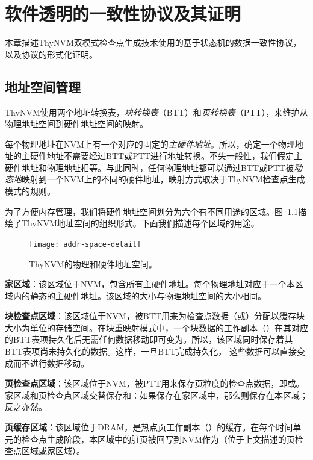 \chapter{软件透明的一致性协议及其证明}
\label{chap:protocol}

本章描述ThyNVM双模式检查点生成技术使用的基于状态机的数据一致性协议，以及协议的形式化证明。

\section{地址空间管理}

ThyNVM使用两个地址转换表，\emph{块转换表}（BTT）和\emph{页转换表}（PTT），来维护从物理地址空间到硬件地址空间的映射。

每个物理地址在NVM上有一个对应的固定的\emph{主硬件地址}。所以，确定一个物理地址的主硬件地址不需要经过BTT或PTT进行地址转换。不失一般性，我们假定主硬件地址和物理地址相等。与此同时，任何物理地址都可以通过BTT或PTT被\emph{动态地}映射到一个NVM上的不同的硬件地址，映射方式取决于ThyNVM检查点生成模式的规则。

为了方便内存管理，我们将硬件地址空间划分为六个有不同用途的区域。图~\ref{fig:addr-space-detail}描绘了ThyNVM地址空间的组织形式。下面我们描述每个区域的用途。

\begin{figure}[!h]
\centering
\texttt{[image: addr-space-detail]}
\caption{ThyNVM的物理和硬件地址空间。}
\label{fig:addr-space-detail}
\end{figure}


\textbf{家区域}：该区域位于NVM，包含所有主硬件地址。每个物理地址对应于一个本区域内的静态的主硬件地址。该区域的大小与物理地址空间的大小相同。

\textbf{块检查点区域}：该区域位于NVM，被BTT用来为检查点数据（\cl[block]或\cp[block]）分配以缓存块大小为单位的存储空间。在块重映射模式中，一个块数据的工作副本（\wa[block]）在其对应的BTT表项持久化后无需任何数据移动即可变为\cl[block]。所以，该区域同时保存着其BTT表项尚未持久化的\wa[block]数据。这样，一旦BTT完成持久化， 这些数据可以直接变成\cl[block]而不进行数据移动。

\textbf{页检查点区域}：该区域位于NVM，被PTT用来保存页粒度的检查点数据，即\cl[page]或\cp[page]。
家区域和页检查点区域交替保存\cl[page]和\cp[page]：如果\cp[page]保存在家区域中，那么\cl[page]则保存在本区域；反之亦然。

\textbf{页缓存区域}：该区域位于DRAM，是热点页工作副本（\wa[page]）的缓存。在每个时间单元的检查点生成阶段，本区域中的脏页被回写到NVM作为\cl[page]（位于上文描述的页检查点区域或家区域）。

